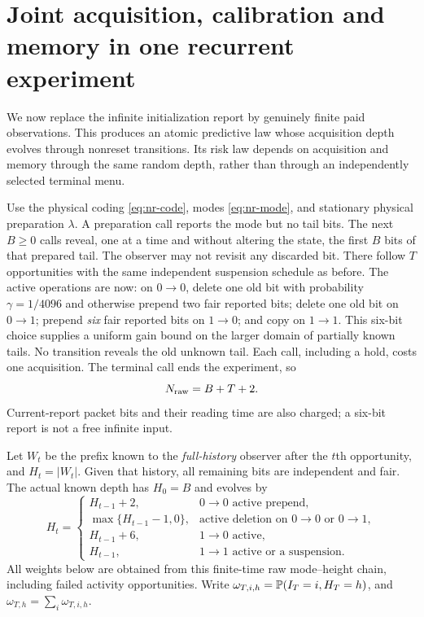 \section{Joint acquisition, calibration and memory in one recurrent experiment}\label{sec:recurrent-acquisition}
We now replace the infinite initialization report by genuinely finite paid observations. This produces an atomic predictive law whose acquisition depth evolves through nonreset transitions. Its risk law depends on acquisition and memory through the same random depth, rather than through an independently selected terminal menu.

Use the physical coding \eqref{eq:nr-code}, modes \eqref{eq:nr-mode}, and stationary physical preparation $\lambda$. A preparation call reports the mode but no tail bits. The next $B\ge0$ calls reveal, one at a time and without altering the state, the first $B$ bits of that prepared tail. The observer may not revisit any discarded bit. There follow $T$ opportunities with the same independent suspension schedule as before. The active operations are now: on $0\to0$, delete one old bit with probability $\gamma=1/4096$ and otherwise prepend two fair reported bits; delete one old bit on $0\to1$; prepend \emph{six} fair reported bits on $1\to0$; and copy on $1\to1$. This six-bit choice supplies a uniform gain bound on the larger domain of partially known tails. No transition reveals the old unknown tail. Each call, including a hold, costs one acquisition. The terminal call ends the experiment, so
\begin{equation}\label{eq:ra-budget}
 N_{\rm raw}=B+T+2.
\end{equation}
Current-report packet bits and their reading time are also charged; a six-bit report is not a free infinite input.

Let $W_t$ be the prefix known to the \emph{full-history} observer after the $t$th opportunity, and $H_t=|W_t|$. Given that history, all remaining bits are independent and fair. The actual known depth has $H_0=B$ and evolves by
\begin{equation}\label{eq:ra-height}
 H_t=\begin{cases}
 H_{t-1}+2,&0\to0\text{ active prepend},\\
 \max\{H_{t-1}-1,0\},&\text{active deletion on }0\to0\text{ or }0\to1,\\
 H_{t-1}+6,&1\to0\text{ active},\\
 H_{t-1},&1\to1\text{ active or a suspension}.
 \end{cases}
\end{equation}
All weights below are obtained from this finite-time raw mode--height chain, including failed activity opportunities. Write $\omega_{T,i,h}=\mathbb P(I_T=i,H_T=h)$, and $\omega_{T,h}=\sum_i\omega_{T,i,h}$.

